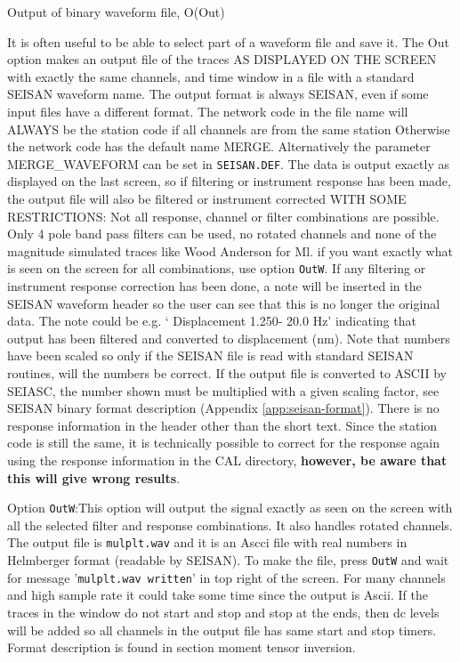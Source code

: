 Output of binary waveform file, O(Out) 

It is often useful to be able to select  part of a waveform file and save it. The Out option makes an output file of the traces AS DISPLAYED ON THE SCREEN with exactly the same channels, and time window in a file with a standard SEISAN waveform name. The output format is always SEISAN, even if some input files have a different format. The network code in the file name will ALWAYS be the station code if all channels are from the same station  Otherwise the network code has the default name MERGE. Alternatively the parameter MERGE\_WAVEFORM can be set in \texttt{SEISAN.DEF}. The data is output exactly as displayed on the last screen, so if filtering or instrument response has been made, the output file will also be filtered or instrument corrected WITH SOME RESTRICTIONS: Not all response, channel or filter combinations are possible. Only 4 pole band pass filters can be used, no rotated channels and none of the magnitude simulated traces like Wood Anderson for Ml. if you want exactly what is seen on the screen for all combinations, use option \texttt{OutW}.  If any filtering or instrument response correction has been done, a note will be inserted in the SEISAN waveform header so the user can see that this is no longer the original data. The note could be e.g. ` Displacement 1.250- 20.0 Hz' indicating that output has been filtered and converted to displacement (nm). Note that numbers have been scaled so only if the SEISAN file is read with standard SEISAN routines, will the numbers be correct. If the output file is converted to ASCII by SEIASC, the number shown must be multiplied with a given scaling factor, see SEISAN binary format description (Appendix \ref{app:seisan-format}). There is no response information in the header other than the short text. Since the station code is still the same, it is technically possible to correct for the response again using the response information in the CAL directory, 
\textbf{however, be aware that this will give wrong results}.

Option \texttt{OutW}:This option will output the signal exactly as seen on the screen with all the selected filter and response combinations. It also handles rotated channels. The output file is \texttt{mulplt.wav} and it is an Ascci file with real numbers in Helmberger format (readable by SEISAN). To make the file, press \texttt{OutW} and wait for message '\texttt{mulplt.wav written}' in top right of the screen. For many channels and high sample rate it could take some time since the output is Ascii. If the traces in the window do not start and stop and stop at the ends, then dc levels will be added so all channels in the output file has same start and stop timers. Format description is found in section moment tensor inversion.  

